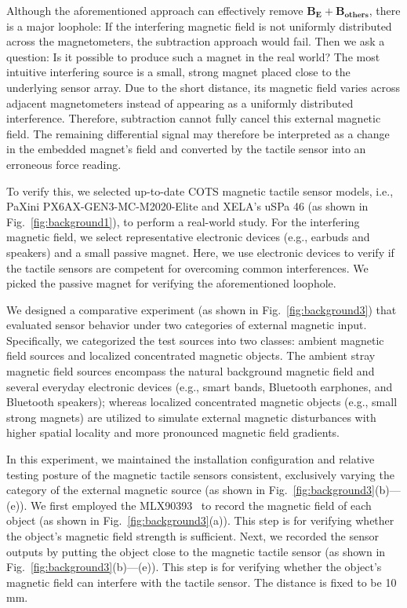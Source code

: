 Although the aforementioned approach can effectively remove $\mathbf{B_{E}}+\mathbf{B_{others}}$, there is a major loophole:
If the interfering magnetic field is not uniformly distributed across the magnetometers, the subtraction approach would fail.
Then we ask a question: Is it possible to produce such a magnet in the real world?
The most intuitive interfering source is a small, strong magnet placed close to the underlying sensor array. Due to the short distance, its magnetic field varies across adjacent magnetometers instead of appearing as a uniformly distributed interference. 
Therefore, subtraction cannot fully cancel this external magnetic field. 
The remaining differential signal may therefore be interpreted as a change in the embedded magnet's field and converted by the tactile sensor into an erroneous force reading.

To verify this, we selected up-to-date COTS magnetic tactile sensor models, i.e., PaXini PX6AX-GEN3-MC-M2020-Elite and XELA's uSPa 46 (as shown in Fig.~\ref{fig:background1}), to perform a real-world study.
For the interfering magnetic field, we select representative electronic devices (e.g., earbuds and speakers) and a small passive magnet.
Here, we use electronic devices to verify if the tactile sensors are competent for overcoming common interferences.
We picked the passive magnet for verifying the aforementioned loophole.

We designed a comparative experiment (as shown in Fig.~\ref{fig:background3}) that evaluated sensor behavior under two categories of external magnetic input. 
Specifically, we categorized the test sources into two classes: ambient magnetic field sources and localized concentrated magnetic objects. 
The ambient stray magnetic field sources encompass the natural background magnetic field and several everyday electronic devices (e.g., smart bands, Bluetooth earphones, and Bluetooth speakers); whereas localized concentrated magnetic objects (e.g., small strong magnets) are utilized to simulate external magnetic disturbances with higher spatial locality and more pronounced magnetic field gradients. 

In this experiment, we maintained the installation configuration and relative testing posture of the magnetic tactile sensors consistent, exclusively varying the category of the external magnetic source (as shown in Fig.~\ref{fig:background3}(b)---(e)). 
We first employed the MLX90393~\cite{melexis_mlx90393_datasheet} to record the magnetic field of each object (as shown in Fig.~\ref{fig:background3}(a)).
This step is for verifying whether the object's magnetic field strength is sufficient.
Next, we recorded the sensor outputs by putting the object close to the magnetic tactile sensor (as shown in Fig.~\ref{fig:background3}(b)---(e)).
This step is for verifying whether the object's magnetic field can interfere with the tactile sensor.
The distance is fixed to be 10 mm.

